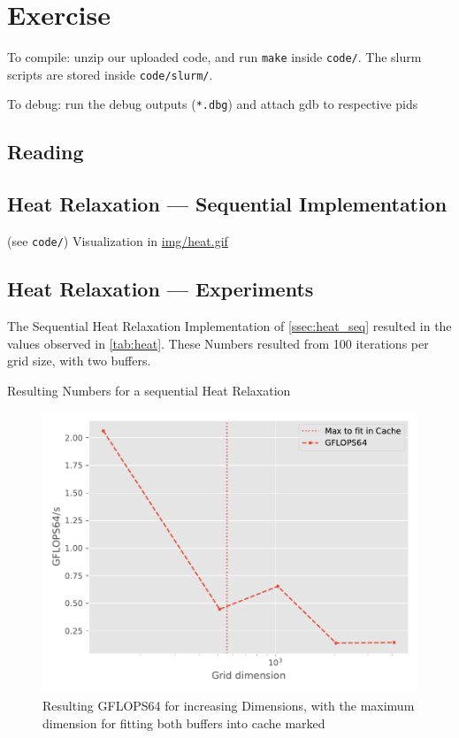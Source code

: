\documentclass[]{scrartcl}
\newcommand{\exercise}{Exercise \thesection}
\begin{document}
\section*{\exercise}

To compile: unzip our uploaded code, and run \verb|make| inside \verb|code/|.
The slurm scripts are stored inside \verb|code/slurm/|.

To debug: run the debug outputs (\verb|*.dbg|) and attach gdb to respective pids

\subsection{Reading}
\subsection{Heat Relaxation --- Sequential Implementation}\label{ssec:heat_seq}
(see \verb|code/|)
Visualization in \href{./img/heat.gif}{img/heat.gif}
\subsection{Heat Relaxation --- Experiments}
The Sequential Heat Relaxation Implementation of \autoref{ssec:heat_seq} resulted in the values observed in \autoref{tab:heat}.
These Numbers resulted from 100 iterations per grid size, with two buffers.
\begin{table}[ht]
    \centering
    \caption{Resulting Numbers for a sequential Heat Relaxation}\label{tab:heat}
    
\end{table}

\begin{figure}[H]
    \centering
    \includegraphics[]{img/heat.pdf}
    \caption{Resulting GFLOPS64 for increasing Dimensions, with the maximum dimension for fitting both buffers into cache marked}\label{fig:heat}
\end{figure}
\end{document}
